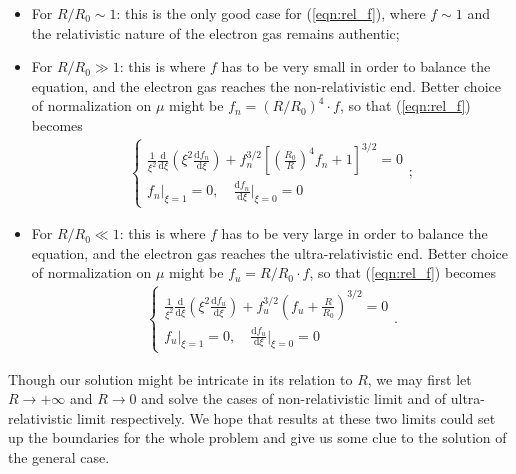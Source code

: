 \documentclass[a4paper,11pt]{article}
\newcommand{\mathdd}{\mathrm{d}}
\numberwithin{equation}{section}
\numberwithin{table}{section}
\numberwithin{figure}{section}
\begin{document}
			\begin{itemize}
				\item For $R/R_0\sim 1$: this is the only good case for (\ref{eqn:rel_f}), where $f\sim 1$ and the relativistic nature of the electron gas remains authentic;
				\item For $R/R_0\gg 1$: this is where $f$ has to be very small in order to balance the equation, and the electron gas reaches the non-relativistic end. Better choice of normalization on $\mu$ might be $f_n=(R/R_0)^4\cdot f$, so that (\ref{eqn:rel_f}) becomes
				\begin{align}
					\left\{\begin{gathered}
						\frac{1}{\xi^2}\frac{\mathdd}{\mathdd\xi}
							\left(\xi^2\frac{\mathdd f_n}{\mathdd\xi}\right)
							+f_n^{3/2}\left[\left(\frac{R_0}{R}\right)^{4}f_n+1\right]^{3/2}=0 \\
						f_n\bigg|_{\xi=1}=0,\quad
							\frac{\mathdd f_n}{\mathdd\xi}\bigg|_{\xi=0}=0
					\end{gathered}\right. ;
					\label{eqn:non_f_eq}{}
				\end{align}
				\item For $R/R_0\ll 1$: this is where $f$ has to be very large in order to balance the equation, and the electron gas reaches the ultra-relativistic end. Better choice of normalization on $\mu$ might be $f_u=R/R_0\cdot f$, so that (\ref{eqn:rel_f}) becomes
				\begin{align}
					\left\{\begin{gathered}
						\frac{1}{\xi^2}\frac{\mathdd}{\mathdd\xi}
							\left(\xi^2\frac{\mathdd f_u}{\mathdd\xi}\right)
							+f_u^{3/2}\left(f_u+\frac{R}{R_0}\right)^{3/2}=0 \\
						f_u\bigg|_{\xi=1}=0,\quad
							\frac{\mathdd f_u}{\mathdd\xi}\bigg|_{\xi=0}=0
						\end{gathered}\right. .
						\label{eqn:ult_f_eq}
				\end{align}
			\end{itemize}
			Though our solution might be intricate in its relation to $R$, we may first let $R\rightarrow+\infty$ and $R\rightarrow 0$ and solve the cases of non-relativistic limit and of ultra-relativistic limit respectively. We hope that results at these two limits could set up the boundaries for the whole problem and give us some clue to the solution of the general case. 
			
\end{document}
